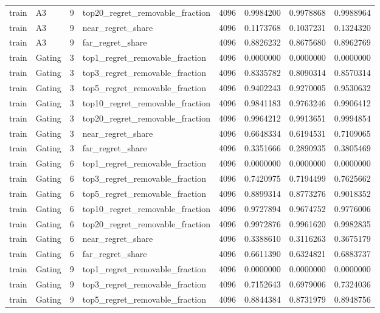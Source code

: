 \begin{tabular}{llrlrrrr}
train & A3 & 9 & top20_regret_removable_fraction & 4096 & 0.9984200 & 0.9978868 & 0.9988964 \\
train & A3 & 9 & near_regret_share & 4096 & 0.1173768 & 0.1037231 & 0.1324320 \\
train & A3 & 9 & far_regret_share & 4096 & 0.8826232 & 0.8675680 & 0.8962769 \\
train & Gating & 3 & top1_regret_removable_fraction & 4096 & 0.0000000 & 0.0000000 & 0.0000000 \\
train & Gating & 3 & top3_regret_removable_fraction & 4096 & 0.8335782 & 0.8090314 & 0.8570314 \\
train & Gating & 3 & top5_regret_removable_fraction & 4096 & 0.9402243 & 0.9270005 & 0.9530632 \\
train & Gating & 3 & top10_regret_removable_fraction & 4096 & 0.9841183 & 0.9763246 & 0.9906412 \\
train & Gating & 3 & top20_regret_removable_fraction & 4096 & 0.9964212 & 0.9913651 & 0.9994854 \\
train & Gating & 3 & near_regret_share & 4096 & 0.6648334 & 0.6194531 & 0.7109065 \\
train & Gating & 3 & far_regret_share & 4096 & 0.3351666 & 0.2890935 & 0.3805469 \\
train & Gating & 6 & top1_regret_removable_fraction & 4096 & 0.0000000 & 0.0000000 & 0.0000000 \\
train & Gating & 6 & top3_regret_removable_fraction & 4096 & 0.7420975 & 0.7194499 & 0.7625662 \\
train & Gating & 6 & top5_regret_removable_fraction & 4096 & 0.8899314 & 0.8773276 & 0.9018352 \\
train & Gating & 6 & top10_regret_removable_fraction & 4096 & 0.9727894 & 0.9674752 & 0.9776006 \\
train & Gating & 6 & top20_regret_removable_fraction & 4096 & 0.9972876 & 0.9961620 & 0.9982835 \\
train & Gating & 6 & near_regret_share & 4096 & 0.3388610 & 0.3116263 & 0.3675179 \\
train & Gating & 6 & far_regret_share & 4096 & 0.6611390 & 0.6324821 & 0.6883737 \\
train & Gating & 9 & top1_regret_removable_fraction & 4096 & 0.0000000 & 0.0000000 & 0.0000000 \\
train & Gating & 9 & top3_regret_removable_fraction & 4096 & 0.7152643 & 0.6979006 & 0.7324036 \\
train & Gating & 9 & top5_regret_removable_fraction & 4096 & 0.8844384 & 0.8731979 & 0.8948756 \\

\end{tabular}
